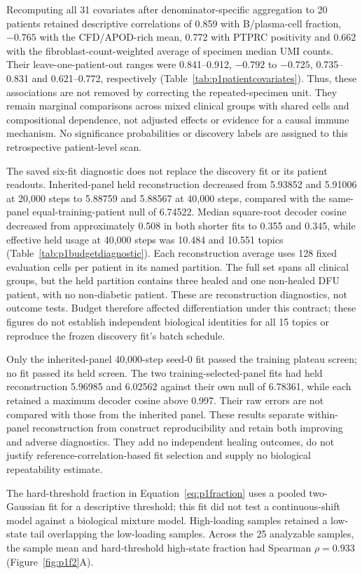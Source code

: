 Recomputing all 31 covariates after denominator-specific aggregation to 20 patients retained descriptive correlations of 0.859 with B/plasma-cell fraction, $-0.765$ with the CFD/APOD-rich mean, 0.772 with PTPRC positivity and 0.662 with the fibroblast-count-weighted average of specimen median UMI counts. Their leave-one-patient-out ranges were 0.841--0.912, $-0.792$ to $-0.725$, 0.735--0.831 and 0.621--0.772, respectively (Table~\ref{tab:p1patientcovariates}). Thus, these associations are not removed by correcting the repeated-specimen unit. They remain marginal comparisons across mixed clinical groups with shared cells and compositional dependence, not adjusted effects or evidence for a causal immune mechanism. No significance probabilities or discovery labels are assigned to this retrospective patient-level scan.

The saved six-fit diagnostic does not replace the discovery fit or its patient readouts. Inherited-panel held reconstruction decreased from 5.93852 and 5.91006 at 20,000 steps to 5.88759 and 5.88567 at 40,000 steps, compared with the same-panel equal-training-patient null of 6.74522. Median square-root decoder cosine decreased from approximately 0.508 in both shorter fits to 0.355 and 0.345, while effective held usage at 40,000 steps was 10.484 and 10.551 topics (Table~\ref{tab:p1budgetdiagnostic}). Each reconstruction average uses 128 fixed evaluation cells per patient in its named partition. The full set spans all clinical groups, but the held partition contains three healed and one non-healed DFU patient, with no non-diabetic patient. These are reconstruction diagnostics, not outcome tests. Budget therefore affected differentiation under this contract; these figures do not establish independent biological identities for all 15 topics or reproduce the frozen discovery fit's batch schedule.

Only the inherited-panel 40,000-step seed-0 fit passed the training plateau screen; no fit passed its held screen. The two training-selected-panel fits had held reconstruction 5.96985 and 6.02562 against their own null of 6.78361, while each retained a maximum decoder cosine above 0.997. Their raw errors are not compared with those from the inherited panel. These results separate within-panel reconstruction from construct reproducibility and retain both improving and adverse diagnostics. They add no independent healing outcomes, do not justify reference-correlation-based fit selection and supply no biological repeatability estimate.

\FloatBarrier
The hard-threshold fraction in Equation~\eqref{eq:p1fraction} uses a pooled two-Gaussian fit for a descriptive threshold; this fit did not test a continuous-shift model against a biological mixture model. High-loading samples retained a low-state tail overlapping the low-loading samples. Across the 25 analyzable samples, the sample mean and hard-threshold high-state fraction had Spearman $\rho=0.933$ (Figure~\ref{fig:p1f2}A\label{call:p1f2}).

